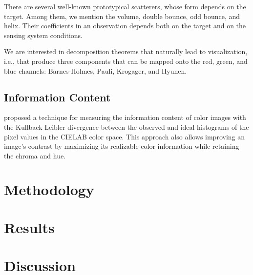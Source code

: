 \documentclass[]{interact}
\theoremstyle{plain}%
\theoremstyle{definition}
\theoremstyle{remark}
\begin{document}
There are several well-known prototypical scatterers, whose form depends on the target.
Among them, we mention the volume, double bounce, odd bounce, and helix.
Their coefficients in an observation depends both on the target and on the sensing system conditions.

We are interested in decomposition theorems that naturally lead to visualization, i.e., that produce three components that can be mapped onto the red, green, and blue channels: Barnes-Holmes, Pauli, Krogager, and Hyunen.

\subsection{Information Content}

\citet{AssessingInformationContentinColorImages} proposed a technique for measuring the information content of color images with the Kullback-Leibler divergence between the observed and ideal histograms of the pixel values in the CIELAB color space.
This approach also allows improving an image's contrast by maximizing its realizable color information while retaining the chroma and hue.




\section{Methodology}


\section{Results}

\section{Discussion}



\end{document}
